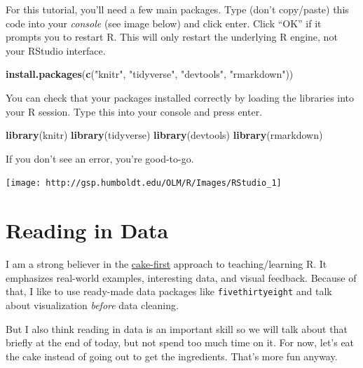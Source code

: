 \documentclass[]{book}
\newenvironment{Shaded}{\begin{snugshade}}{\end{snugshade}}
\newcommand{\KeywordTok}[1]{\textcolor[rgb]{0.13,0.29,0.53}{\textbf{#1}}}
\newcommand{\StringTok}[1]{\textcolor[rgb]{0.31,0.60,0.02}{#1}}
\newcommand{\NormalTok}[1]{#1}
\begin{document}
For this tutorial, you'll need a few main packages. Type (don't
copy/paste) this code into your \emph{console} (see image below) and
click enter. Click ``OK'' if it prompts you to restart R. This will only
restart the underlying R engine, not your RStudio interface.

\begin{Shaded}
\begin{Highlighting}[]
\KeywordTok{install.packages}\NormalTok{(}\KeywordTok{c}\NormalTok{(}\StringTok{"knitr"}\NormalTok{, }\StringTok{"tidyverse"}\NormalTok{, }\StringTok{"devtools"}\NormalTok{, }\StringTok{"rmarkdown"}\NormalTok{))}
\end{Highlighting}
\end{Shaded}

You can check that your packages installed correctly by loading the
libraries into your R session. Type this into your console and press
enter.

\begin{Shaded}
\begin{Highlighting}[]
\KeywordTok{library}\NormalTok{(knitr)}
\KeywordTok{library}\NormalTok{(tidyverse)}
\KeywordTok{library}\NormalTok{(devtools)}
\KeywordTok{library}\NormalTok{(rmarkdown)}
\end{Highlighting}
\end{Shaded}

If you don't see an error, you're good-to-go.

\begin{center}\texttt{[image: http://gsp.humboldt.edu/OLM/R/Images/RStudio\_1]} \end{center}

\chapter{Reading in Data}\label{reading-in-data}

I am a strong believer in the
\href{https://twitter.com/minebocek/status/1072222447473168389}{cake-first}
approach to teaching/learning R. It emphasizes real-world examples,
interesting data, and visual feedback. Because of that, I like to use
ready-made data packages like \texttt{fivethirtyeight} and talk about
visualization \emph{before} data cleaning.

But I also think reading in data is an important skill so we will talk
about that briefly at the end of today, but not spend too much time on
it. For now, let's eat the cake instead of going out to get the
ingredients. That's more fun anyway.
\end{document}
